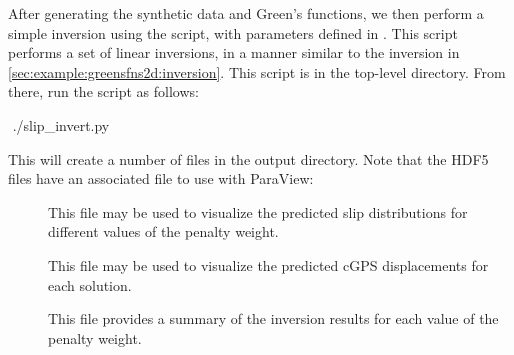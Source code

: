 After generating the synthetic data and Green's functions, we then
perform a simple inversion using the  script,
with parameters defined in . This script
performs a set of linear inversions, in a manner similar to the
inversion in \vref{sec:example:greensfns2d:inversion}. This script is
in the top-level  directory. From there, run the
script as follows:
\begin{shell}
$$ ./slip_invert.py
\end{shell}
This will create a number of files in the output directory. Note that
the HDF5 files have an associated  file to use with
ParaView:
\begin{description}
\item[] This file may
  be used to visualize the predicted slip distributions for different
  values of the penalty weight.
\item[] This file may be used to
  visualize the predicted cGPS displacements for each solution.
\item[] This file provides a summary
  of the inversion results for each value of the penalty weight.
\end{description}

